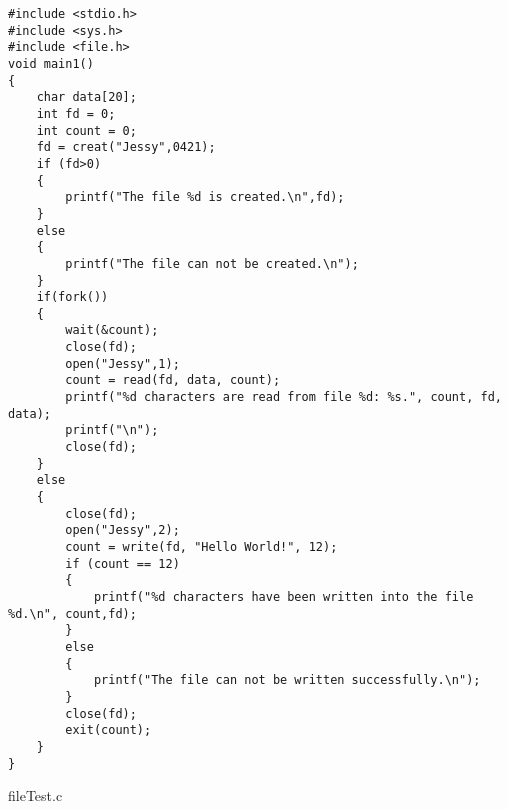 \begin{listing}[htbp]
    \begin{verbatim}
#include <stdio.h>
#include <sys.h>
#include <file.h>
void main1()
{
    char data[20];
    int fd = 0;
    int count = 0;
    fd = creat("Jessy",0421); 
    if (fd>0)
    {
        printf("The file %d is created.\n",fd);
    }
    else
    {
        printf("The file can not be created.\n");
    }
    if(fork())
    {
        wait(&count);
        close(fd);
        open("Jessy",1);
        count = read(fd, data, count);
        printf("%d characters are read from file %d: %s.", count, fd, data);
        printf("\n");
        close(fd);
    }
    else
    {
        close(fd);
        open("Jessy",2);
        count = write(fd, "Hello World!", 12);
        if (count == 12)
        {
            printf("%d characters have been written into the file %d.\n", count,fd);
        }
        else
        {
            printf("The file can not be written successfully.\n");
        }
        close(fd);
        exit(count);
    }
}
    \end{verbatim}
    \caption{fileTest.c}\label{lst:fileTest3}
\end{listing}
